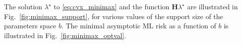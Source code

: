 \documentclass[letterpaper, conference]{IEEEtran}      %
\begin{document}
The solution $\lambda^\star$ to \eqref{eq:cvx_minimax} and the function $\mathbf H \lambda^\star$ are illustrated in Fig.~\ref{fig:minimax_support}, for various values of the support size of the parameters space $b$. The minimal asymptotic ML risk as a function of $b$ is illustrated in Fig.~\ref{fig:minimax_optval}. 

\begin{figure}
\begin{center}
\end{center}
\end{figure}
\end{document}
